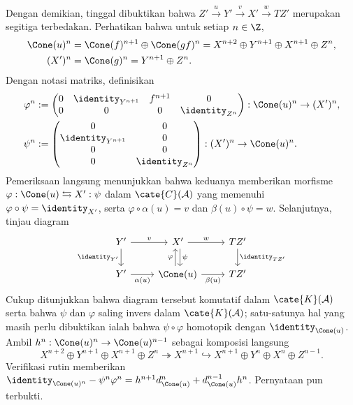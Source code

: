 \begin{bukti}
	Dengan demikian, tinggal dibuktikan bahwa
	$Z' \xrightarrow{u} Y' \xrightarrow{v} X' \xrightarrow{w} TZ'$ merupakan
	segitiga terbedakan. Perhatikan bahwa untuk setiap $n \in \Z$,
	\begin{align*}
		\Cone(u)^n & = \Cone(f)^{n+1} \oplus \Cone(gf)^n = X^{n+2} \oplus Y^{n+1} \oplus X^{n+1} \oplus Z^n , \\
		(X')^n & = \Cone(g)^n = Y^{n+1} \oplus Z^n .
	\end{align*}
	Dengan notasi matriks, definisikan
	\begin{align*}
		\varphi^n & := \begin{pmatrix} 0 & \identity_{Y^{n+1}} & f^{n+1} & 0 \\ 0 & 0 & 0 & \identity_{Z^n} \end{pmatrix} : \Cone(u)^n \to (X')^n , \\
		\psi^n & := \begin{pmatrix} 0 & 0 \\ \identity_{Y^{n+1}} & 0 \\ 0 & 0 \\ 0 & \identity_{Z^n} \end{pmatrix} : (X')^n \to \Cone(u)^n .
	\end{align*}
	Pemeriksaan langsung menunjukkan bahwa keduanya memberikan morfisme
	$\varphi: \Cone(u) \leftrightarrows X' : \psi$ dalam
	$\cate{C}(\mathcal{A})$ yang memenuhi
	$\varphi \circ \psi = \identity_{X'}$, serta
	$\varphi \circ \alpha(u) = v$ dan $\beta(u) \circ \psi = w$.
	Selanjutnya, tinjau diagram
	\[\begin{tikzcd}
		Y' \arrow[r, "v"] \arrow[d, "\identity_{Y'}"'] & X' \arrow[r, "w"] \arrow[shift left, d, "\psi"] & TZ' \arrow[d, "\identity_{TZ'}"] \\
		Y' \arrow[r, "\alpha(u)"'] & \Cone(u) \arrow[r, "\beta(u)"'] \arrow[shift left, u, "\varphi"] & TZ'
	\end{tikzcd}\]
	Cukup ditunjukkan bahwa diagram tersebut komutatif dalam
	$\cate{K}(\mathcal{A})$ serta bahwa $\psi$ dan $\varphi$ saling invers dalam
	$\cate{K}(\mathcal{A})$; satu-satunya hal yang masih perlu dibuktikan ialah
	bahwa $\psi \circ \varphi$ homotopik dengan
	$\identity_{\Cone(u)}$. Ambil $h^n : \Cone(u)^n \to \Cone(u)^{n-1}$ sebagai
	komposisi langsung
	\[ X^{n+2} \oplus Y^{n+1} \oplus X^{n+1} \oplus Z^n \twoheadrightarrow X^{n+1} \hookrightarrow X^{n+1} \oplus Y^n \oplus X^n \oplus Z^{n-1}. \]
	Verifikasi rutin memberikan
	$\identity_{\Cone(u)^n} - \psi^n \varphi^n = h^{n+1} d_{\Cone(u)}^n + d_{\Cone(u)}^{n-1} h^n$.
	Pernyataan pun terbukti.
\end{bukti}

